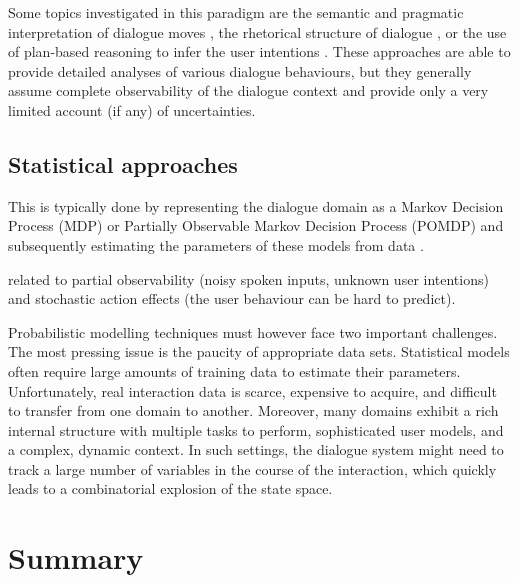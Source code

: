 Some topics investigated in this paradigm are the semantic and pragmatic interpretation of dialogue moves \citep{ThomasonManuscript-THOEUA,Ginzburg2012}, the rhetorical structure of dialogue \citep{0521659515}, or the use of plan-based reasoning to infer the user intentions \citep{Allen1980,Litman87}.  These approaches are able to provide detailed analyses of various dialogue behaviours, but they generally assume complete observability of the dialogue context and provide only a very limited account (if any) of uncertainties.



\subsection{Statistical approaches}


This is typically done by representing the dialogue domain as a Markov Decision Process (MDP) or Partially Observable Markov Decision Process (POMDP) and subsequently estimating the parameters of these models from data \citep{Supelec270}. 

 related to partial observability (noisy spoken inputs, unknown user intentions) and stochastic action effects (the user behaviour can be hard to predict). 
 
  Probabilistic modelling techniques must however face two important challenges. The most pressing issue is the paucity of appropriate data sets.  Statistical models often require large amounts of training data to estimate their parameters. Unfortunately, real interaction data is scarce, expensive to acquire, and difficult to transfer from one domain to another.  Moreover, many domains exhibit a rich internal structure with multiple tasks to perform, sophisticated user models, and a complex, dynamic context.  In such settings, the dialogue system might need to track a large number of variables in the course of the interaction, which quickly leads to a combinatorial explosion of the state space.  
  

\section{Summary}
